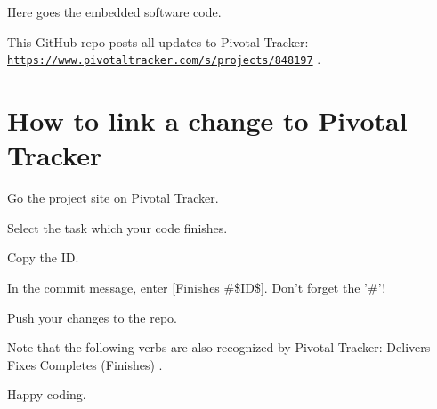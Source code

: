 Here goes the embedded software code.

This Git\-Hub repo posts all updates to Pivotal Tracker\-: \href{https://www.pivotaltracker.com/s/projects/848197}{\tt https\-://www.\-pivotaltracker.\-com/s/projects/848197} .

\section*{How to link a change to Pivotal Tracker}


\begin{DoxyEnumerate}
\item Go the project site on Pivotal Tracker.
\item Select the task which your code finishes.
\item Copy the I\-D.
\item In the commit message, enter \mbox{[}Finishes \#\$\-I\-D\$\mbox{]}. Don't forget the '\#'!
\item Push your changes to the repo.
\end{DoxyEnumerate}

Note that the following verbs are also recognized by Pivotal Tracker\-: Delivers Fixes Completes (Finishes) .

Happy coding. 